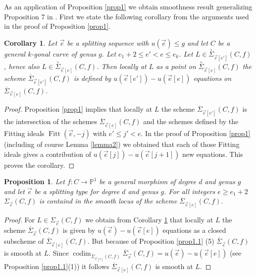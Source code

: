 \documentclass{article}
\DeclareMathOperator{\codim}{codim}
\DeclareMathOperator{\Fitt}{Fitt}
\newtheorem{proposition}{Proposition}
\newtheorem{corollary}{Corollary}
\theoremstyle{definition}
\theoremstyle{remark}
\begin{document}
As an application of Proposition \ref{prop1} we obtain smoothness result generalizing Proposition 7 in \cite{ref2}.
First we state the following corollary from the arguments used in the proof of Proposition \ref{prop1}.

\begin{corollary}\label{cor2.1}
Let $\overrightarrow{e}$ be a splitting sequence with $u(\overrightarrow{e})\leq g$ and let $C$ be a general $k$-gonal curve of genus $g$.
Let $e_1+2 \leq e' < e \leq e_k$.
Let $L \in \overset{\circ}{\Sigma}_{\overrightarrow {e}[e']}(C,f)$, hence also $L \in \overset{\circ}{\Sigma}_{\overrightarrow {e}[e]}(C,f)$.
Then locally at $L$ as a point on $\overset{\circ}{\Sigma}_{\overrightarrow{e}[e]}(C,f)$ the scheme $\overline{\Sigma}_{\overrightarrow{e}[e']}(C,f)$ is defined by $u(\overrightarrow {e}[e'])-u(\overrightarrow {e}[e])$ equations on $\overline{\Sigma}_{\overrightarrow{e}[e]}(C,f)$.
\end{corollary}
\begin{proof}
Proposition \ref{prop1} implies that locally at $L$ the scheme $\overline {\Sigma}_{\overrightarrow {e}[e']}(C,f)$ is the intersection of the schemes $\overline {\Sigma}_{\overrightarrow {e}[e]}(C,f)$ and the schemes defined by the Fitting ideals $\Fitt (\overrightarrow {e}, -j)$ with $e' \leq j' < e$.
In the proof of Proposition \ref{prop1} (including of course Lemma \ref{lemma2}) we obtained that each of those Fitting ideals gives a contribution of $u(\overrightarrow{e}[j])-u(\overrightarrow{e}[j+1])$ new equations.
This proves the corollary.
\end{proof}

\begin{proposition}\label{prop2}
Let $f : C \rightarrow \mathbb{P}^1$ be a general morphism of degree $d$ and genus $g$ and let $\overrightarrow {e}$ be a splitting type for degree $d$ and genus $g$.
For all integers $e \geq e_1+2$ $\Sigma _{\overrightarrow {e}}(C,f)$ is containd in the smooth locus of the scheme $\overline {\Sigma}_{\overrightarrow {e}[e]}(C,f)$.
\end{proposition}
\begin{proof}
For $L\in \Sigma _{\overrightarrow {e}}(C,f)$ we obtain from Corollary \ref{cor2.1}  that locally at $L$ the scheme $\overline {\Sigma}_{\overrightarrow {e}}(C,f)$ is given by $u(\overrightarrow {e})-u(\overrightarrow {e}[e])$ equations as a closed subscheme of $\overline {\Sigma} _{\overrightarrow {e}[e]}(C,f)$.
But because of Proposition \ref{prop1.1} (5) $\overline {\Sigma}_{\overrightarrow {e}}(C,f)$ is smooth at $L$.
Since $\codim _{\overline{\Sigma}_{\overrightarrow {e}[e]}(C,f)} \overline{\Sigma}_{\overrightarrow {e}}(C,f) = u(\overrightarrow {e})-u(\overrightarrow {e}[e])$ (see Proposition \ref{prop1.1}(1)) it follows $\overline{\Sigma}_{\overrightarrow {e}[e]}(C,f)$ is smooth at $L$.
\end{proof}
\end{document}

